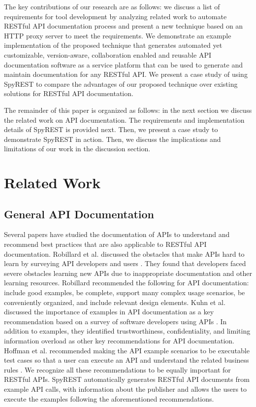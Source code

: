 \documentclass[conference]{IEEEtran}
\begin{document}
The key contributions of our research are as follows: we discuss a list of requirements for tool development by analyzing related work to automate RESTful API documentation process and present a new technique based on an HTTP proxy server to meet the requirements. We demonstrate an example implementation of the proposed technique that generates automated yet customizable, version-aware, collaboration enabled and reusable API documentation software as a service platform that can be used to generate and maintain documentation for any RESTful API. We present a case study of using SpyREST to compare the advantages of our proposed technique over existing solutions for RESTful API documentation.

The remainder of this paper is organized as follows: in the next section we discuss the related work on API documentation. The requirements and implementation details of SpyREST is provided next. Then, we present a case study to demonstrate SpyREST in action. Then, we discuss the implications and limitations of our work in the discussion section.


\section{Related Work} %
\label{sec:related_work}
\subsection{General API Documentation} %
\label{ssub:api_learnability}
Several papers have studied the documentation of APIs to understand and recommend best practices that are also applicable to RESTful API documentation. Robillard et al. discussed the obstacles that make APIs hard to learn by surveying API developers and users \cite{Robillard_what_makes} \cite{Robillard_a_field_study}. They found that  developers faced severe obstacles learning new APIs due to inappropriate documentation and other learning resources. Robillard recommended the following for API documentation: include good examples, be complete, support many complex usage scenarios, be conveniently organized, and include relevant design elements. Kuhn et al. discussed the importance of examples in API documentation as a key recommendation based on a survey of software developers using APIs \cite{Kuhn_on_designing}. In addition to examples, they identified trustworthiness, confidentiality, and limiting information overload as other key recommendations for API documentation. Hoffman et al. recommended making the API example scenarios to be executable test cases so that a user can execute an API and understand the related business rules \cite{Hoffman_api_documentation}. We recognize all these recommendations to be equally important for RESTful APIs. SpyREST automatically generates RESTful API documents from example API calls, with information about the publisher and allows the users to execute the examples following the aforementioned recommendations.
\end{document}
